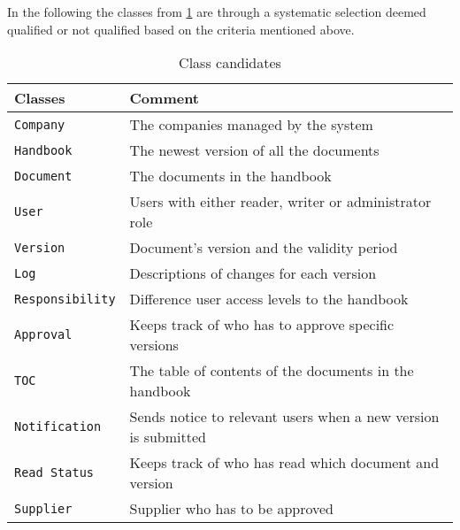 In the following the classes from \cref{tab:ClassCandidates} are through a systematic selection deemed qualified or not qualified based on the criteria mentioned above.


\begin{table} [H]
\begin{tabular}{l l}
	\hline
	Classes & Comment\\
	\hline
	\texttt{Company} & The companies managed by the system \\
	\texttt{Handbook} & The newest version of all the documents\\
	\texttt{Document} & The documents in the handbook\\
	\texttt{User }& Users with either reader, writer or administrator role\\
	\texttt{Version} & Document’s version and the validity period\\
	\texttt{Log} & Descriptions of changes for each version\\ 
	\texttt{Responsibility} & Difference user access levels to the handbook\\ 
	\texttt{Approval} & Keeps track of who has to approve specific 
	versions\\ 
	\texttt{TOC} & The table of contents of the documents in the handbook\\
	\texttt{Notification} & Sends notice to relevant users when a new version is submitted\\ 
	\texttt{Read Status} & Keeps track of who has read which document and version\\
	\texttt{Supplier} & Supplier who has to be approved \\
	\hline
\end{tabular}
\caption{Class candidates}\label{tab:ClassCandidates}
\end{table} 

